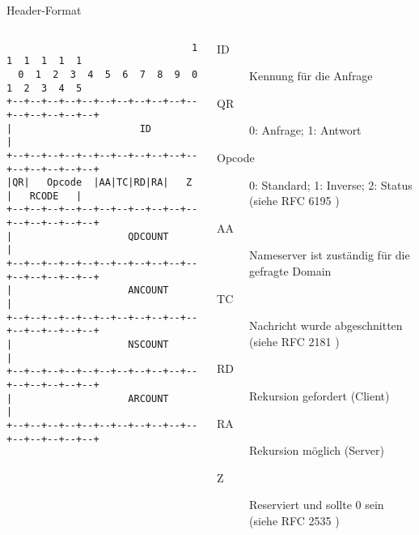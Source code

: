 \documentclass{beamer}
\begin{document}
  \begin{frame}[fragile]{\mytitle}{Header-Format}
    \begin{columns}[c]
      \column{5cm}
      \tiny{
        \begin{verbatim}
                                1  1  1  1  1  1
  0  1  2  3  4  5  6  7  8  9  0  1  2  3  4  5
+--+--+--+--+--+--+--+--+--+--+--+--+--+--+--+--+
|                      ID                       |
+--+--+--+--+--+--+--+--+--+--+--+--+--+--+--+--+
|QR|   Opcode  |AA|TC|RD|RA|   Z    |   RCODE   |
+--+--+--+--+--+--+--+--+--+--+--+--+--+--+--+--+
|                    QDCOUNT                    |
+--+--+--+--+--+--+--+--+--+--+--+--+--+--+--+--+
|                    ANCOUNT                    |
+--+--+--+--+--+--+--+--+--+--+--+--+--+--+--+--+
|                    NSCOUNT                    |
+--+--+--+--+--+--+--+--+--+--+--+--+--+--+--+--+
|                    ARCOUNT                    |
+--+--+--+--+--+--+--+--+--+--+--+--+--+--+--+--+
        \end{verbatim}
      } 
      \column{7cm}
      \footnotesize{
        \begin{description}
          \item[ID] Kennung für die Anfrage
          \item[QR] 0: Anfrage; 1: Antwort
          \item[Opcode] 0: Standard; 1: Inverse; 2: Status (siehe RFC 6195 \cite{rfc6195})
          \item[AA] Nameserver ist zuständig für die gefragte Domain
          \item[TC] Nachricht wurde abgeschnitten (siehe RFC 2181 \cite{rfc2181})
          \item[RD] Rekursion gefordert (Client)
          \item[RA] Rekursion möglich (Server)
          \item[Z] Reserviert und sollte 0 sein\\(siehe RFC 2535 \cite{rfc2535})
        \end{description}
      }
    \end{columns}
\end{frame}
\end{document}
